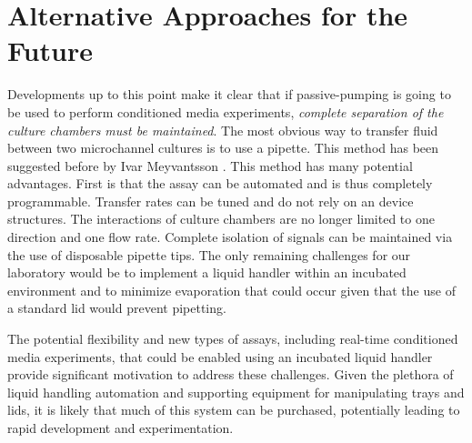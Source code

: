 \section{Alternative Approaches for the Future}
Developments up to this point make it clear that if passive-pumping is going to be used to perform conditioned media experiments, \emph{complete separation of the culture chambers must be maintained}. The most obvious way to transfer fluid between two microchannel cultures is to use a pipette. This method has been suggested before by Ivar Meyvantsson \cite{Meyvantsson:2006gf}. This method has many potential advantages. First is that the assay can be automated and is thus completely programmable. Transfer rates can be tuned and do not rely on an device structures. The interactions of culture chambers are no longer limited to one direction and one flow rate. Complete isolation of signals can be maintained via the use of disposable pipette tips. The only remaining challenges for our laboratory would be to implement a liquid handler within an incubated environment and to minimize evaporation that could occur given that the use of a standard lid would prevent pipetting.

The potential flexibility and new types of assays, including real-time conditioned media experiments, that could be enabled using an incubated liquid handler provide significant motivation to address these challenges. Given the plethora of liquid handling automation and supporting equipment for manipulating trays and lids, it is likely that much of this system can be purchased, potentially leading to rapid development and experimentation.

